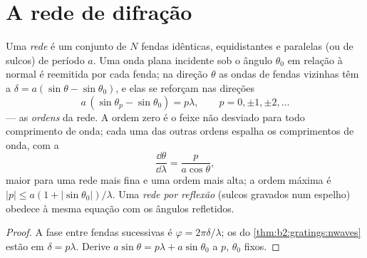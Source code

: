 \section{A rede de difração}

\begin{proposition}\label{prop:b2:gratings:equation}
Uma \emph{rede} é um conjunto de $N$ fendas idênticas, equidistantes e paralelas
(ou de sulcos) de período $a$. Uma onda plana incidente sob o ângulo $\theta_0$
em relação à normal é reemitida por cada fenda; na direção $\theta$ as
ondas de fendas vizinhas têm a  $\delta = a(\sin\theta
- \sin\theta_0)$, e elas se reforçam nas direções
\[
a\,(\sin\theta_p - \sin\theta_0) = p\lambda , \qquad p = 0, \pm1, \pm2, \dots
\]
--- as \emph{ordens} da rede. A ordem zero é o feixe não desviado
para todo comprimento de onda; cada uma das outras ordens espalha os comprimentos de onda,
com a \emph{}
\[
\frac{\dd\theta}{\dd\lambda} = \frac{p}{a\cos\theta} ,
\]
maior para uma rede mais fina e uma ordem mais alta; a ordem máxima é
$|p| \le a(1 + |\sin\theta_0|)/\lambda$. Uma \emph{rede por reflexão} (sulcos gravados
num espelho) obedece à mesma equação com os ângulos refletidos.
\end{proposition}

\begin{proof}
A fase entre fendas sucessivas é $\varphi = 2\pi\delta/\lambda$; os  do \cref{thm:b2:gratings:nwaves} estão em $\delta = p\lambda$.
Derive $a\sin\theta = p\lambda + a\sin\theta_0$ a $p$, $\theta_0$ fixos.
\end{proof}

